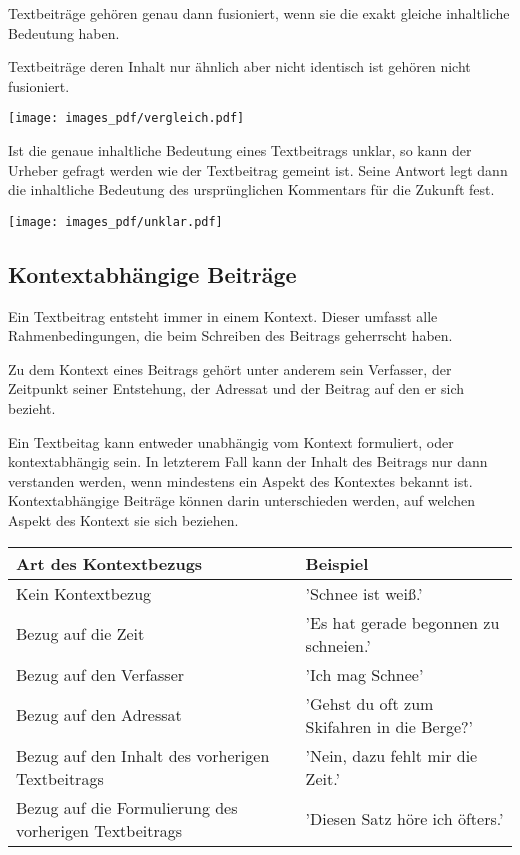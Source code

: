 \documentclass{article}
\begin{document}
	Textbeiträge gehören genau dann fusioniert, wenn sie die exakt gleiche inhaltliche Bedeutung haben.
	
	\bigskip
	Textbeiträge deren Inhalt nur ähnlich aber nicht identisch ist gehören nicht fusioniert.
	
	\bigskip
	\texttt{[image: images\_pdf/vergleich.pdf]}
	
	\bigskip
	Ist die genaue inhaltliche Bedeutung eines Textbeitrags unklar, so kann der Urheber gefragt werden wie der Textbeitrag gemeint ist. Seine Antwort legt dann die inhaltliche Bedeutung des ursprünglichen Kommentars für die Zukunft fest.
	
	\bigskip
	\texttt{[image: images\_pdf/unklar.pdf]}
	
	
	\subsection{Kontextabhängige Beiträge}
	
	Ein Textbeitrag entsteht immer in einem Kontext. Dieser umfasst alle Rahmenbedingungen, die beim Schreiben des Beitrags geherrscht haben. 
	
	\bigskip
	Zu dem Kontext eines Beitrags gehört unter anderem sein Verfasser, der Zeitpunkt seiner Entstehung, der Adressat und der Beitrag auf den er sich bezieht.
	
	\bigskip
	Ein Textbeitag kann entweder unabhängig vom Kontext formuliert, oder kontextabhängig sein. In letzterem Fall kann der Inhalt des Beitrags nur dann verstanden werden, wenn mindestens ein Aspekt des Kontextes bekannt ist. Kontextabhängige Beiträge können darin unterschieden werden, auf welchen Aspekt des Kontext sie sich beziehen.
	
	\bigskip
	\begin{tabular}{|p{9cm}|p{7cm}|}
		\hline
		Art des Kontextbezugs & Beispiel\\
		\hline
		Kein Kontextbezug & 'Schnee ist weiß.'\\
		\hline
		Bezug auf die Zeit & 'Es hat gerade begonnen zu schneien.'\\
		\hline
		Bezug auf den Verfasser & 'Ich mag Schnee'\\
		\hline
		Bezug auf den Adressat & 'Gehst du oft zum Skifahren in die Berge?'\\
		\hline
		Bezug auf den Inhalt des vorherigen Textbeitrags & 'Nein, dazu fehlt mir die Zeit.'\\
		\hline
		Bezug auf die Formulierung des vorherigen Textbeitrags & 'Diesen Satz höre ich öfters.'\\
		\hline
	\end{tabular}
	
\end{document}
